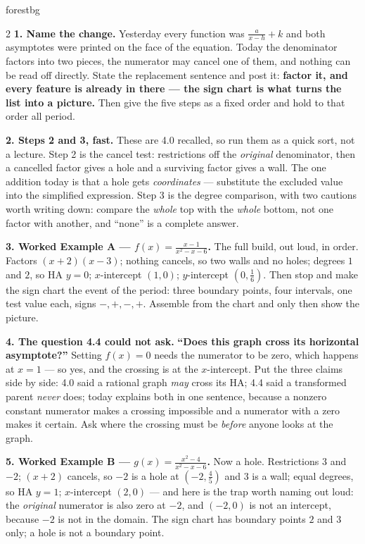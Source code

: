 \documentclass[10pt]{article}
\begin{document}
\begin{skillbox}[Lesson]{forestbg}
\begin{multicols}{2}
\textbf{1. Name the change.} Yesterday every function was $\frac{a}{x-h}+k$ and both asymptotes were
printed on the face of the equation. Today the denominator factors into two pieces, the numerator may
cancel one of them, and nothing can be read off directly. State the replacement sentence and post it:
\textbf{factor it, and every feature is already in there --- the sign chart is what turns the list into
a picture.} Then give the five steps as a fixed order and hold to that order all period.

\textbf{2. Steps 2 and 3, fast.} These are 4.0 recalled, so run them as a quick sort, not a lecture.
Step 2 is the cancel test: restrictions off the \emph{original} denominator, then a cancelled factor
gives a hole and a surviving factor gives a wall. The one addition today is that a hole gets
\emph{coordinates} --- substitute the excluded value into the simplified expression. Step 3 is the
degree comparison, with two cautions worth writing down: compare the \emph{whole} top with the
\emph{whole} bottom, not one factor with another, and ``none'' is a complete answer.

\textbf{3. Worked Example A --- $f(x)=\frac{x-1}{x^2-x-6}$.} The full build, out loud, in order.
Factors $(x+2)(x-3)$; nothing cancels, so two walls and no holes; degrees $1$ and $2$, so HA $y=0$;
$x$-intercept $(1,0)$; $y$-intercept $(0,\frac16)$. Then stop and make the sign chart the event of the
period: three boundary points, four intervals, one test value each, signs $-,+,-,+$. Assemble from the
chart and only then show the picture.

\columnbreak

\textbf{4. The question 4.4 could not ask.} \textbf{``Does this graph cross its horizontal asymptote?''}
Setting $f(x)=0$ needs the numerator to be zero, which happens at $x=1$ --- so yes, and the crossing is
at the $x$-intercept. Put the three claims side by side: 4.0 said a rational graph \emph{may} cross its
HA; 4.4 said a transformed parent \emph{never} does; today explains both in one sentence, because a
nonzero constant numerator makes a crossing impossible and a numerator with a zero makes it certain.
Ask where the crossing must be \emph{before} anyone looks at the graph.

\textbf{5. Worked Example B --- $g(x)=\frac{x^2-4}{x^2-x-6}$.} Now a hole. Restrictions $3$ and $-2$;
$(x+2)$ cancels, so $-2$ is a hole at $(-2,\frac45)$ and $3$ is a wall; equal degrees, so HA $y=1$;
$x$-intercept $(2,0)$ --- and here is the trap worth naming out loud: the \emph{original} numerator is
also zero at $-2$, and $(-2,0)$ is not an intercept, because $-2$ is not in the domain. The sign chart
has boundary points $2$ and $3$ only; a hole is not a boundary point.


\end{multicols}
\end{skillbox}
\end{document}
